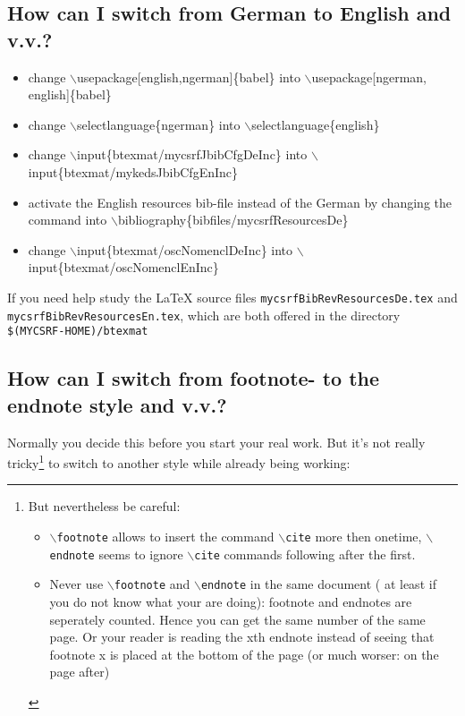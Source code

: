 \documentclass[DIV=calc,BCOR=5mm,11pt,headings=small,oneside,abstract=true, toc=bib]{scrartcl}
\begin{document}
\subsection{How can I switch from German to English and v.v.?}

\begin{itemize}
  \item change $\backslash$usepackage[english,ngerman]\{babel\} into
  $\backslash$usepackage[ngerman, english]\{babel\}
  \item change $\backslash$selectlanguage\{ngerman\} into 
  $\backslash$selectlanguage\{english\} 
  \item change $\backslash$input\{btexmat/mycsrfJbibCfgDeInc\} into
  $\backslash$input\{btexmat/my\-keds\-Jbib\-CfgEnInc\}
  \item activate the English resources bib-file instead of the German by
  changing the command into $\backslash$bibliography\{bibfiles/mycsrfResourcesDe\}
  \item change $\backslash$input\{btexmat/osc\-Nomencl\-De\-Inc\} into
  $\backslash$input\{btexmat/osc\-Nomencl\-En\-Inc\}
\end{itemize}

If you need help study the LaTeX source files
\texttt{mycsrfBibRevResourcesDe.tex} and
\texttt{mycsrfBibRevResourcesEn.tex}, which are both offered in the directory
\texttt{\$(MYCSRF-HOME)/btexmat}

\subsection{How can I switch from footnote- to the endnote style and v.v.?}

Normally you decide this before you start your real work. But it's not
really tricky\footnote{
But nevertheless be careful: 
\begin{itemize}
  \item \texttt{$\backslash$footnote} allows to insert the command
  \texttt{$\backslash$cite} more then onetime, \texttt{$\backslash$endnote}
  seems to ignore \texttt{$\backslash$cite} commands following after the first.
  \item Never use \texttt{$\backslash$footnote} and \texttt{$\backslash$endnote}
  in the same document ( at least if you do not know what your are
  doing): footnote and endnotes are seperately counted. Hence you can get the
  same number of the same page. Or your reader is reading the xth endnote
  instead of seeing that footnote x is placed at the bottom of the page (or
  much worser: on the page after)
\end{itemize}} to switch to another style while already being working:
\end{document}
